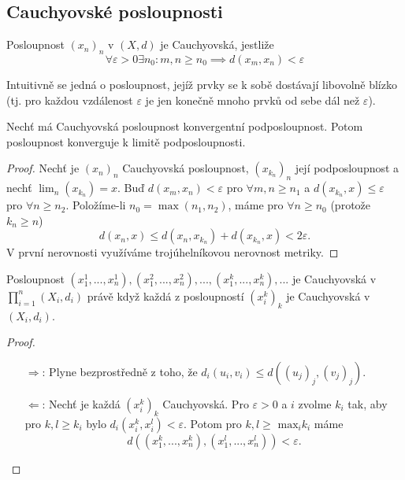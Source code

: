 \documentclass[../main.tex]{subfiles}
\begin{document}
\subsection{Cauchyovské posloupnosti}

\begin{definition}
	Posloupnost $(x_n)_n$ v $(X,d)$ je Cauchyovská, jestliže
	\[ \forall \varepsilon > 0 \exists n_0: m,n \geq n_0 \implies d(x_m, x_n) < \varepsilon \]
\end{definition}

\begin{intuition}
	Intuitivně se jedná o posloupnost, jejíž prvky se k sobě dostávají libovolně blízko (tj. pro každou vzdálenost $\varepsilon$ je jen konečně mnoho prvků od sebe dál než $\varepsilon$).
\end{intuition}

\begin{lemma}
	Nechť má Cauchyovská posloupnost konvergentní podposloupnost. Potom posloupnost konverguje k limitě
	podposloupnosti.
\end{lemma}

\begin{proof}
	Nechť je $(x_n)_n$ Cauchyovská posloupnost, $(x_{k_n})_n$ její podposloupnost a nechť $\lim_{n}(x_{k_n}) = x.$ Buď $d(x_m,x_n) < \varepsilon$ pro $ \forall m,n \geq n_1$ 
	a $d(x_{k_n},x) \leq \varepsilon$ pro $\forall n \geq n_2$. Položíme-li $n_0 = \max(n_1,n_2)$, máme pro $\forall n \geq n_0$ (protože $k_n \geq n$)
	\[d(x_n,x) \leq d(x_n,x_{k_n}) + d(x_{k_n},x) < 2\varepsilon.\]
	V první nerovnosti využíváme trojúhelníkovou nerovnost metriky.
\end{proof}

\begin{lemma}
	Posloupnost $(x_{1}^{1}, ... , x_{n}^{1}), (x_{1}^{2},...,x_{n}^{2}), ...,(x_{1}^{k},...,x_{n}^{k}),...$
	je Cauchyovská v $\prod_{i=1}^{n}(X_i, d_i)$ právě když každá z posloupností $(x_{i}^{k})_k$ je
	Cauchyovská v $(X_i, d_i)$.
\end{lemma}

\begin{proof}
	\begin{itemize}
	    \item[ $\Rightarrow$:] Plyne bezprostředně z toho, že $d_i(u_i,v_i) \leq d((u_j)_j,(v_j)_j).$
	    \item[ $\Leftarrow$:] Nechť je každá $(x_i^k)_k$ Cauchyovská. Pro $\varepsilon > 0$ a $i$ zvolme $k_i$ tak,
	    aby pro $k,l \geq k_i$ bylo $d_i(x_i^k, x_i^l) < \varepsilon.$ Potom pro $k,l \geq$ $\text{max}_i k_i$ máme 
	    \[d((x_1^k,...,x_n^k),(x_1^l,...,x_n^l)) < \varepsilon.\]
	\end{itemize}
\end{proof}
\end{document}
